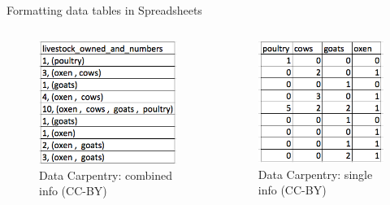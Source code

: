 \documentclass[aspectratio=43, 11pt]{beamer} %
\begin{document}
\begin{frame}{Formatting data tables in Spreadsheets}
\begin{columns}
\begin{column}{0.5\textwidth}
\begin{figure}[H]
        \centering
        \includegraphics[height=.6\textheight]{figures/multiple-info.png}
        \caption{Data Carpentry: combined info (CC-BY)}
        \label{fig:combined}
    \end{figure}
    \end{column}
    \begin{column}{0.5\textwidth}

    \begin{figure}[H]
    \begin{center}
        \includegraphics[height=.6\textheight]{figures/single-info.png}
        \caption{Data Carpentry: single info (CC-BY)}
        \label{fig:single}
        \end{center}
    \end{figure}
    \end{column}
    \end{columns}
\end{frame}
\end{document}
